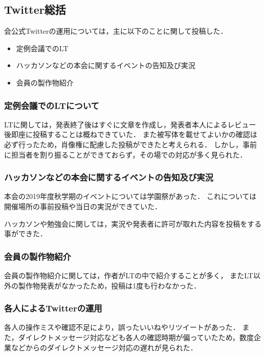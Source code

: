 \subsection*{Twitter総括}


会公式Twitterの運用については，主に以下のことに関して投稿した．
\begin{itemize}
\item 定例会議でのLT
\item ハッカソンなどの本会に関するイベントの告知及び実況
\item 会員の製作物紹介
\end{itemize}

\subsubsection*{定例会議でのLTについて}
LTに関しては，発表終了後はすぐに文章を作成し，発表者本人によるレビュー後即座に投稿することは概ねできていた．
また被写体を載せてよいかの確認は必ず行ったため，肖像権に配慮した投稿ができたと考えられる．
しかし，事前に担当者を割り振ることができておらず，その場での対応が多く見られた．

\subsubsection*{ハッカソンなどの本会に関するイベントの告知及び実況}
本会の2019年度秋学期のイベントについては学園祭があった．
これについては開催場所の事前投稿や当日の実況ができていた．

ハッカソンや勉強会に関しては，実況や発表者に許可が取れた内容を投稿をする事ができた．

\subsubsection*{会員の製作物紹介}
会員の製作物紹介に関しては，作者がLTの中で紹介することが多く，
またLT以外の製作物発表がなかったため，投稿は1度も行わなかった．

\subsubsection*{各人によるTwitterの運用}
各人の操作ミスや確認不足により，誤ったいいねやリツイートがあった．
また，ダイレクトメッセージ対応なども各人の確認時期が偏っていたため，数度企業などからのダイレクトメッセージ対応の遅れが見られた．

